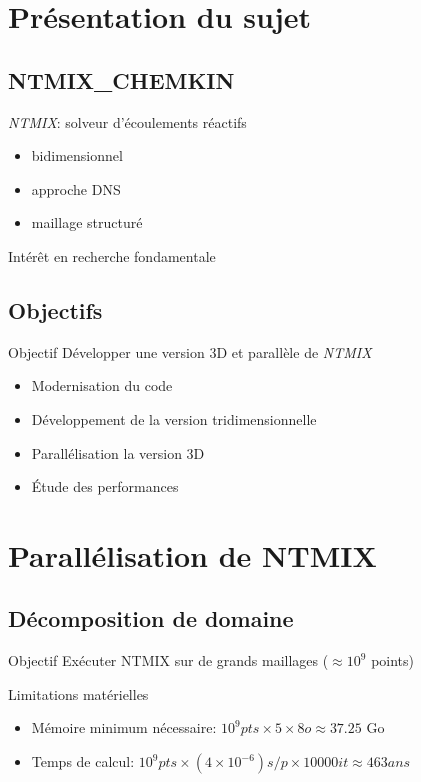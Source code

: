 \documentclass{beamer}
\begin{document}
%
%
\section{Présentation du sujet}
\subsection{NTMIX\_CHEMKIN}
\begin{frame}
  \textit{NTMIX}: solveur d'écoulements réactifs
  \begin{itemize}
  \item bidimensionnel
  \item approche DNS
  \item maillage structuré
  \end{itemize}
  Intérêt en recherche fondamentale
  
\end{frame}


\subsection{Objectifs}
\begin{frame}

  \begin{block}{Objectif}
    Développer une version 3D et parallèle de \textit{NTMIX}
  \end{block}
  \begin{itemize}
  \item Modernisation du code
  \item Développement de la version tridimensionnelle
  \item Parallélisation la version 3D
  \item Étude des performances
  \end{itemize} 
\end{frame}


%
%

\section{Parallélisation de NTMIX}
\subsection{Décomposition de domaine}
\begin{frame}
  \begin{block}{Objectif}
    Exécuter NTMIX sur de grands maillages ($\approx 10^9$ points)
  \end{block}
  \pause
  \begin{alertblock}{Limitations matérielles}
    \begin{itemize}
    \item     Mémoire minimum nécessaire: $10^9pts \times 5 \times 8o \approx 37.25$ Go
    \item     Temps de calcul: $10^9 pts\times(4\times10^{-6})s/p\times10000it\approx463ans$
    \end{itemize}
  \end{alertblock}
  
\end{frame}
\end{document}
